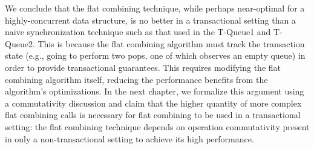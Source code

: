 We conclude that the flat combining technique, while perhaps near-optimal for a highly-concurrent data structure, is no better in a transactional setting than a naive synchronization technique such as that used in the T-Queue1 and T-Queue2. This is because the flat combining algorithm must track the transaction state (e.g., going to perform two pops, one of which observes an empty queue) in order to provide transactional guarantees. This requires modifying the flat combining algorithm itself, reducing the performance benefits from the algorithm's optimizations. In the next chapter, we formalize this argument using a commutativity discussion and claim that the higher quantity of more complex flat combining calls is necessary for flat combining to be used in a transactional setting: the flat combining technique depends on operation commutativity present in only a non-transactional setting to achieve its high performance. 
